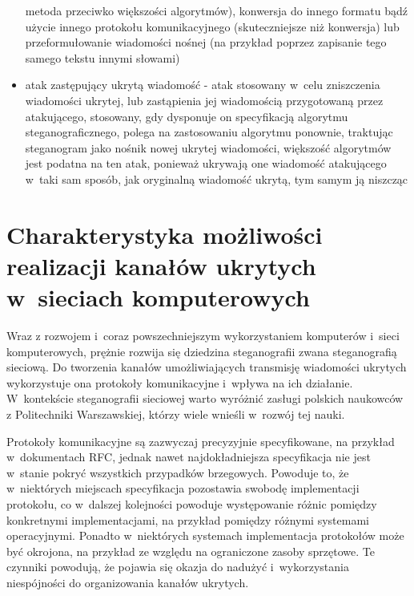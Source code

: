 \documentclass[a4paper, twoside, 12pt]{report}
\begin{document}
\begin{itemize}
                metoda przeciwko większości algorytmów), konwersja do innego formatu
                bądź użycie innego protokołu komunikacyjnego (skuteczniejsze niż konwersja) lub
                przeformułowanie wiadomości nośnej (na przykład poprzez zapisanie tego samego tekstu
                innymi słowami)
            \item atak zastępujący ukrytą wiadomość - atak stosowany w~celu zniszczenia
                wiadomości ukrytej, lub zastąpienia jej wiadomością przygotowaną przez atakującego,
                stosowany, gdy dysponuje on specyfikacją algorytmu steganograficznego,
                polega na zastosowaniu algorytmu ponownie, traktując steganogram jako nośnik
                nowej ukrytej wiadomości, większość algorytmów jest podatna na ten
                atak, ponieważ ukrywają one wiadomość atakującego w~taki sam sposób,
                jak oryginalną wiadomość ukrytą, tym samym ją niszcząc
        \end{itemize}


\chapter{Charakterystyka możliwości realizacji kanałów ukrytych w~sieciach komputerowych}
    Wraz z rozwojem i~coraz powszechniejszym wykorzystaniem komputerów i~sieci
    komputerowych, prężnie rozwija się dziedzina steganografii zwana steganografią
    sieciową. Do tworzenia kanałów umożliwiających transmisję wiadomości ukrytych
    wykorzystuje ona protokoły komunikacyjne i~wpływa na ich działanie. W~kontekście
    steganografii sieciowej warto wyróżnić zasługi polskich naukowców z Politechniki
    Warszawskiej, którzy wiele wnieśli w~rozwój tej nauki\cite{STEGANOGRAFIASIECIOWAART}.

    Protokoły komunikacyjne są zazwyczaj
    precyzyjnie specyfikowane, na przykład w~dokumentach RFC, jednak nawet najdokładniejsza
    specyfikacja nie jest w~stanie pokryć wszystkich przypadków brzegowych. Powoduje
    to, że w~niektórych miejscach specyfikacja pozostawia swobodę implementacji protokołu,
    co w~dalszej kolejności powoduje występowanie różnic pomiędzy konkretnymi
    implementacjami, na przykład pomiędzy różnymi systemami operacyjnymi. Ponadto
    w~niektórych systemach implementacja protokołów może być okrojona, na przykład
    ze względu na ograniczone zasoby sprzętowe. Te czynniki
    powodują, że pojawia się okazja do nadużyć i~wykorzystania niespójności do organizowania
    kanałów ukrytych.
\end{document}
